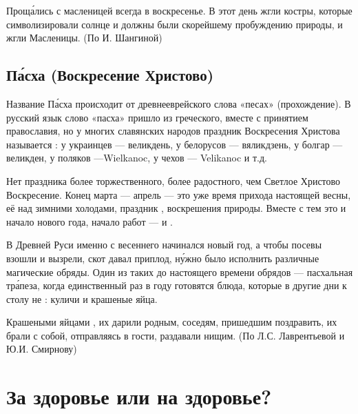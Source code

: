 Прощ\'{а}лись с масленицей всегда в воскресенье.
В этот день жгли костры, которые символизировали солнце и должны были  скорейшему пробуждению природы, и жгли  Масленицы. (По И. Шангиной)



\subsection{П\'{а}сха (Воскресение Христово)}
Название П\'{а}сха происходит от древнееврейского слова «песах» (прохождение). В русский язык слово «пасха» пришло из греческого, вместе с принятием православия, но у многих славянских народов праздник Воскресения Христова называется : у украинцев --- великдень, у белорусов --- вяликдзень, у болгар --- великден, у поляков ---Wielkanoc, у чехов --- Velikanoc и т.д.

Нет праздника более торжественного, более радостного, чем Светлое
Христово Воскресение. Конец марта --- апрель --- это уже время прихода
настоящей весны, её 
над зимними холодами, праздник ,
воскрешения природы. Вместе с тем это и начало нового
года, начало  работ
---  и .

В Древней Руси именно с весеннего 
начинался новый год, а чтобы посевы  взошли и вызрели,
скот давал приплод, н\'{у}жно было исполнить различные магические обряды.
Один из таких  до настоящего времени обрядов
--- пасхальная тр\'{а}пеза, когда единственный раз в году готовятся блюда,
которые в другие дни к столу не :
куличи и крашеные яйца.

Крашеными яйцами ,
их дарили родным, соседям, пришедшим поздравить, их брали с собой, отправляясь
в гости, раздавали нищим. (По Л.С. Лаврентьевой и Ю.И. Смирнову)

\section{За здоровье или на здоровье?}

